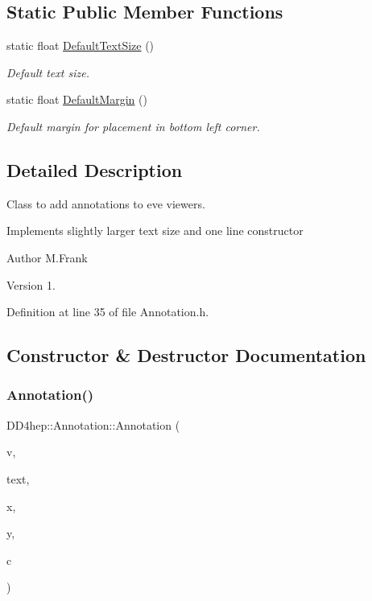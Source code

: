 \subsection*{Static Public Member Functions}
\begin{DoxyCompactItemize}
\item 
static float \hyperlink{class_d_d4hep_1_1_annotation_a935265c70c04d194c2de49408f860db6}{Default\+Text\+Size} ()
\begin{DoxyCompactList}\small\item\em Default text size. \end{DoxyCompactList}\item 
static float \hyperlink{class_d_d4hep_1_1_annotation_a8d10a81577c74708c3458905b5d239dc}{Default\+Margin} ()
\begin{DoxyCompactList}\small\item\em Default margin for placement in bottom left corner. \end{DoxyCompactList}\end{DoxyCompactItemize}


\subsection{Detailed Description}
Class to add annotations to eve viewers. 

Implements slightly larger text size and one line constructor

\begin{DoxyAuthor}{Author}
M.\+Frank 
\end{DoxyAuthor}
\begin{DoxyVersion}{Version}
1. 
\end{DoxyVersion}


Definition at line 35 of file Annotation.\+h.



\subsection{Constructor \& Destructor Documentation}
\hypertarget{class_d_d4hep_1_1_annotation_a8b1b5f5ca85400bf6f580a91f6e7cebc}{}\label{class_d_d4hep_1_1_annotation_a8b1b5f5ca85400bf6f580a91f6e7cebc} 
\subsubsection{\texorpdfstring{Annotation()}{Annotation()}}
{\footnotesize\ttfamily D\+D4hep\+::\+Annotation\+::\+Annotation (\begin{DoxyParamCaption}\item[{T\+Eve\+Viewer $\ast$}]{v,  }\item[{const std\+::string \&}]{text,  }\item[{float}]{x,  }\item[{float}]{y,  }\item[{Color\+\_\+t}]{c }\end{DoxyParamCaption})}



